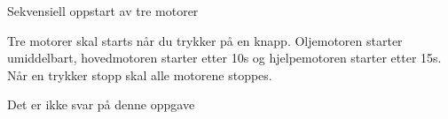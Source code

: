 


Sekvensiell oppstart av tre motorer 

Tre motorer skal starts når du trykker på en knapp. Oljemotoren starter
umiddelbart, hovedmotoren starter etter 10s og hjelpemotoren starter
etter 15s. Når en trykker stopp skal alle motorene stoppes. 






Det er ikke svar på denne oppgave












